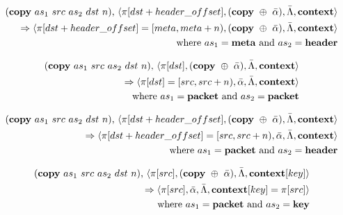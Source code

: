 \begin{equation}
\begin{split}
  (\textrm{\textbf{copy}} \ as_1 \ src \ as_2 \ dst \ n)
  \textrm{,} \ \langle \pi[dst + header\_offset], (\textrm{\textbf{copy}} \ \oplus \ \bar \alpha), \bar \Lambda, \textrm{\textbf{context}} \rangle \\
  \Rightarrow
  \langle \pi[dst + header\_offset] = [meta, meta + n), (\textrm{\textbf{copy}} \ \oplus \ \bar \alpha), \bar \Lambda, \textrm{\textbf{context}} \rangle \\
    \textrm{where} \ as_1 = \textrm{\textbf{meta} and } as_2 =
    \textrm{\textbf{header}}
\end{split}
\end{equation}

\begin{equation}
\begin{split}
  (\textrm{\textbf{copy}} \ as_1 \ src \ as_2 \ dst \ n)
  \textrm{,} \ \langle \pi[dst], (\textrm{\textbf{copy}} \ \oplus \ \bar \alpha), \bar \Lambda, \textrm{\textbf{context}} \rangle \\
  \Rightarrow 
  \langle \pi[dst] = [src, src + n), \bar \alpha, \bar \Lambda, \textrm{\textbf{context}} \rangle \\
    \textrm{where} \ as_1 = \textrm{\textbf{packet} and } as_2 =
    \textrm{\textbf{packet}}
\end{split}
\end{equation}

\begin{equation}
\begin{split}
  (\textrm{\textbf{copy}} \ as_1 \ src \ as_2 \ dst \ n)
  \textrm{,} \ \langle \pi[dst + header\_offset], (\textrm{\textbf{copy}} \ \oplus \ \bar \alpha), \bar \Lambda, \textrm{\textbf{context}} \rangle \\
  \Rightarrow
  \langle \pi[dst + header\_offset] = [src, src + n), \bar \alpha, \bar \Lambda, \textrm{\textbf{context}} \rangle \\
    \textrm{where} \ as_1 = \textrm{\textbf{packet} and } as_2 =
    \textrm{\textbf{header}}
\end{split}
\end{equation}

\begin{equation}
\begin{split}
  (\textrm{\textbf{copy}} \ as_1 \ src \ as_2 \ dst \ n)
  \textrm{,} \ \langle \pi[src], (\textrm{\textbf{copy}} \ \oplus \ \bar \alpha), \bar \Lambda, \textrm{\textbf{context}}[key] \rangle \\
  \Rightarrow
  \langle \pi[src], \bar \alpha, \bar \Lambda, \textrm{\textbf{context}}[key] = \pi[src] \rangle \\
    \textrm{where} \ as_1 = \textrm{\textbf{packet} and } as_2 =
    \textrm{\textbf{key}}
\end{split}
\end{equation}

